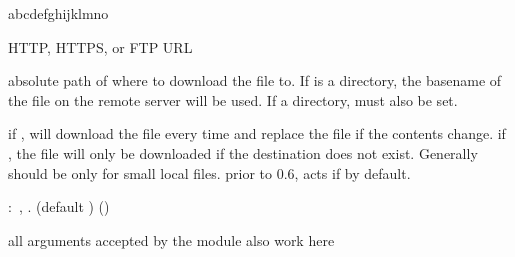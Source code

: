 


\begin{xlist}{abcdefghijklmno}
  \item[\man\,\C{url}]
	HTTP, HTTPS, or FTP URL 
		
		\item[\man\,\C{dest}]
	absolute path of where to download the file to. 
		If  is a directory, the basename of the file on the remote server will be used. If a directory,  must also be set. 
		
		\item[\opt\,\C{thirsty}]
	if , will download the file every time and replace the file if the contents change. if , the file will only be downloaded if the destination does not exist. Generally should be  only for small local files. prior to 0.6, acts if  by default. 
		
		:\,
		    ,
		    .
		    (default )
		()
		\item[\opt\,\C{others}]
	all arguments accepted by the  module also work here 
		
		\end{xlist}
		




